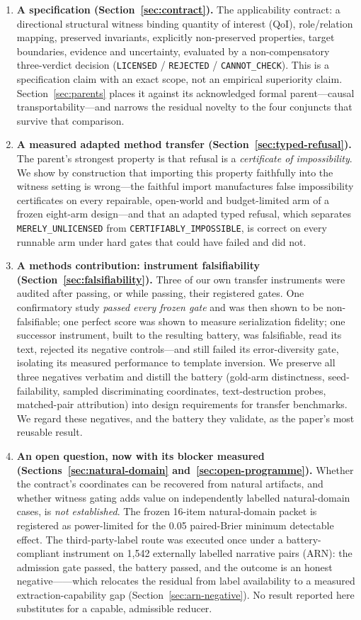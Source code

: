 \begin{enumerate}[leftmargin=*]
\item \textbf{A specification (Section~\ref{sec:contract}).} The applicability contract: a directional structural witness binding quantity of interest (QoI), role/relation mapping, preserved invariants, explicitly non-preserved properties, target boundaries, evidence and uncertainty, evaluated by a non-compensatory three-verdict decision (\texttt{LICENSED} / \texttt{REJECTED} / \texttt{CANNOT\_CHECK}). This is a specification claim with an exact scope, not an empirical superiority claim. Section~\ref{sec:parents} places it against its acknowledged formal parent---causal transportability---and narrows the residual novelty to the four conjuncts that survive that comparison.
\item \textbf{A measured adapted method transfer (Section~\ref{sec:typed-refusal}).} The parent's strongest property is that refusal is a \emph{certificate of impossibility}. We show by construction that importing this property faithfully into the witness setting is wrong---the faithful import manufactures false impossibility certificates on every repairable, open-world and budget-limited arm of a frozen eight-arm design---and that an adapted typed refusal, which separates \texttt{MERELY\_UNLICENSED} from \texttt{CERTIFIABLY\_IMPOSSIBLE}, is correct on every runnable arm under hard gates that could have failed and did not.
\item \textbf{A methods contribution: instrument falsifiability (Section~\ref{sec:falsifiability}).} Three of our own transfer instruments were audited after passing, or while passing, their registered gates. One confirmatory study \emph{passed every frozen gate} and was then shown to be non-falsifiable; one perfect score was shown to measure serialization fidelity; one successor instrument, built to the resulting battery, was falsifiable, read its text, rejected its negative controls---and still failed its error-diversity gate, isolating its measured performance to template inversion. We preserve all three negatives verbatim and distill the battery (gold-arm distinctness, seed-failability, sampled discriminating coordinates, text-destruction probes, matched-pair attribution) into design requirements for transfer benchmarks. We regard these negatives, and the battery they validate, as the paper's most reusable result.
\item \textbf{An open question, now with its blocker measured (Sections~\ref{sec:natural-domain} and~\ref{sec:open-programme}).} Whether the contract's coordinates can be recovered from natural artifacts, and whether witness gating adds value on independently labelled natural-domain cases, is \emph{not established}. The frozen 16-item natural-domain packet is registered as power-limited for the 0.05 paired-Brier minimum detectable effect. The third-party-label route was executed once under a battery-compliant instrument on 1{,}542 externally labelled narrative pairs (ARN): the admission gate passed, the battery passed, and the outcome is an honest negative------which relocates the residual from label availability to a measured extraction-capability gap (Section~\ref{sec:arn-negative}). No result reported here substitutes for a capable, admissible reducer.

\end{enumerate}
